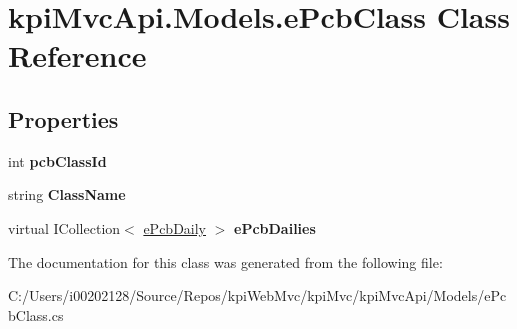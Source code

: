 \hypertarget{classkpi_mvc_api_1_1_models_1_1e_pcb_class}{}\section{kpi\+Mvc\+Api.\+Models.\+e\+Pcb\+Class Class Reference}
\label{classkpi_mvc_api_1_1_models_1_1e_pcb_class}
\subsection*{Properties}
\begin{DoxyCompactItemize}
\item 
\mbox{\label{classkpi_mvc_api_1_1_models_1_1e_pcb_class_a8b36c4bfc5defe8635fee82c322bb0ba}} 
int {\bfseries pcb\+Class\+Id}
\item 
\mbox{\label{classkpi_mvc_api_1_1_models_1_1e_pcb_class_a500ea1e13f072588b3b5819b824f7084}} 
string {\bfseries Class\+Name}
\item 
\mbox{\label{classkpi_mvc_api_1_1_models_1_1e_pcb_class_a82ccc59df5f3655f36e6f34046877c4a}} 
virtual I\+Collection$<$ \hyperlink{classkpi_mvc_api_1_1_models_1_1e_pcb_daily}{e\+Pcb\+Daily} $>$ {\bfseries e\+Pcb\+Dailies}
\end{DoxyCompactItemize}


The documentation for this class was generated from the following file\+:\begin{DoxyCompactItemize}
\item 
C\+:/\+Users/i00202128/\+Source/\+Repos/kpi\+Web\+Mvc/kpi\+Mvc/kpi\+Mvc\+Api/\+Models/e\+Pcb\+Class.\+cs\end{DoxyCompactItemize}
